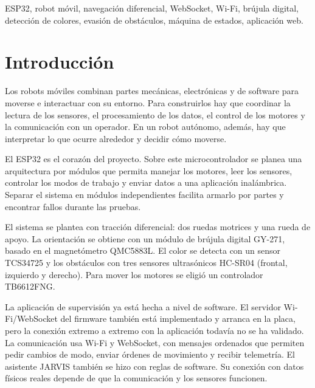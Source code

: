 \documentclass[journal]{IEEEtran}
\begin{document}

\begin{IEEEkeywords}
ESP32, robot móvil, navegación diferencial, WebSocket, Wi-Fi, brújula digital, detección de colores, evasión de obstáculos, máquina de estados, aplicación web.
\end{IEEEkeywords}


\section{Introducción}

Los robots móviles combinan partes mecánicas, electrónicas y de software para moverse e interactuar con su entorno. Para construirlos hay que coordinar la lectura de los sensores, el procesamiento de los datos, el control de los motores y la comunicación con un operador. En un robot autónomo, además, hay que interpretar lo que ocurre alrededor y decidir cómo moverse.

El ESP32 es el corazón del proyecto. Sobre este microcontrolador se planea una arquitectura por módulos que permita manejar los motores, leer los sensores, controlar los modos de trabajo y enviar datos a una aplicación inalámbrica. Separar el sistema en módulos independientes facilita armarlo por partes y encontrar fallos durante las pruebas.

El sistema se plantea con tracción diferencial: dos ruedas motrices y una rueda de apoyo. La orientación se obtiene con un módulo de brújula digital GY-271, basado en el magnetómetro QMC5883L. El color se detecta con un sensor TCS34725 y los obstáculos con tres sensores ultrasónicos HC-SR04 (frontal, izquierdo y derecho). Para mover los motores se eligió un controlador TB6612FNG.

La aplicación de supervisión ya está hecha a nivel de software. El servidor Wi-Fi/WebSocket del firmware también está implementado y arranca en la placa, pero la conexión extremo a extremo con la aplicación todavía no se ha validado. La comunicación usa Wi-Fi y WebSocket, con mensajes ordenados que permiten pedir cambios de modo, enviar órdenes de movimiento y recibir telemetría. El asistente JARVIS también se hizo con reglas de software. Su conexión con datos físicos reales depende de que la comunicación y los sensores funcionen.
\end{document}
